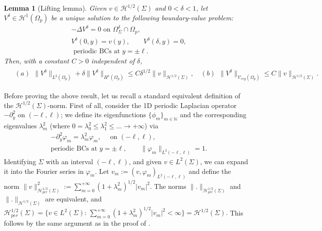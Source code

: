 \documentclass[report]{elsarticle}
\newtheorem{lemma}[theorem]{Lemma}
\numberwithin{theorem}{section}
\begin{document}
\begin{lemma}[Lifting lemma]
	\label{lemma:lifting_lemma}
	Given $v\in \mathcal{H}^{1/2}(\Sigma)$ and  $0<\delta<1$, let $V^{\delta}\in \mathcal{H}^1(\Omega_p)$ be a unique solution to the following boundary-value problem:
	\begin{align*}
		&-\Delta V^{\delta}=0 \text{ on }\Omega_{\Sigma}^{\delta}\cap\Omega_p,\\
		&V^{\delta}(0,y)=v(y), \qquad V^{\delta}(\delta,y)=0,\\
		&\text{ periodic BCs at }y=\pm \ell.
	\end{align*}
	Then, with a constant $C>0$ independent of $\delta$, 
	\begin{align}
		\begin{split}
		\label{eq:bound_deltaL2}
		&(a)\,\;\|V^{\delta}\|_{L^2(\Omega_p)}+\delta\|V^{\delta}\|_{H^1(\Omega_p)}\leq C \delta^{1/2}\|v\|_{\mathcal{H}^{1/2}(\Sigma)},\quad
		(b)\,\;\|V^{\delta}\|_{\mathcal{V}_{reg}(\Omega_p)}\leq C\|v\|_{\mathcal{H}^{1/2}(\Sigma)}.
		\end{split}
	\end{align}
\end{lemma}
Before proving the above result, let us recall a standard equivalent definition of the $\mathcal{H}^{1/2}(\Sigma)$-norm. 
First of all, consider the 1D periodic Laplacian operator $-\partial_y^2$ on $(-\ell,\ell)$; we define its eigenfunctions $\{\phi_m\}_{m\in\mathbb{N}}$ and the corresponding eigenvalues $\lambda_m^2$ (where $0=\lambda_0^2\leq \lambda_1^2\leq\ldots \rightarrow +\infty$) via 
\begin{align*}
		&-\partial_y^2 \varphi_m=\lambda_m^2 \varphi_m, \quad \text{ on }(-\ell,\ell),\\
		&\text{periodic BCs at }y=\pm \ell,\qquad \|\varphi_m\|_{L^2(-\ell,\ell)}=1. 
\end{align*}
Identifying $\Sigma$ with an interval $(-\ell,\ell)$, and given $v\in L^2(\Sigma)$, we can expand it into the Fourier series in $\varphi_m$. Let  $v_m:=(v,\varphi_m)_{L^2(-\ell,\ell)}$ and define the norm $
	\|v\|_{\mathcal{H}^{1/2}_{per}(\Sigma)}^2:=\sum\limits_{m=0}^{+\infty}(1+\lambda_m^2)^{1/2}|v_m|^2.$ 
The norms $\|.\|_{\mathcal{H}^{1/2}_{per}(\Sigma)}$ and $\|.\|_{\mathcal{H}^{1/2}(\Sigma)}$ are equivalent, and 
$
	\mathcal{H}^{1/2}_{per}(\Sigma)=\{v\in L^2(\Sigma): \, \sum\limits_{m=0}^{+\infty}(1+\lambda_m^2)^{1/2}|v_m|^2<\infty\}=\mathcal{H}^{1/2}(\Sigma).$
This follows by the same argument as in the proof of \cite[Lemma 2.10]{cabre_tan}. 
\end{document}
